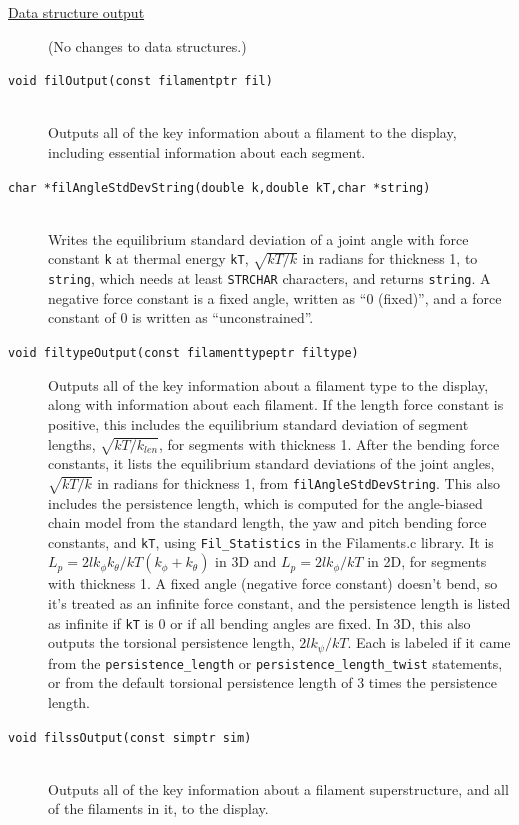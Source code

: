 \documentclass {scrbook}
\newcommand {\ttt} {\texttt}
\begin{document}
\begin{description}
\item[\underline{Data structure output}]
(No changes to data structures.)

\item[\ttt{void filOutput(const filamentptr fil)}]
\hfill \\
Outputs all of the key information about a filament to the display, including essential information about each segment.

\item[\ttt{char *filAngleStdDevString(double k,double kT,char *string)}]
\hfill \\
Writes the equilibrium standard deviation of a joint angle with force constant \ttt{k} at thermal energy \ttt{kT}, $\sqrt{kT/k}$ in radians for thickness 1, to \ttt{string}, which needs at least \ttt{STRCHAR} characters, and returns \ttt{string}. A negative force constant is a fixed angle, written as ``0 (fixed)'', and a force constant of 0 is written as ``unconstrained''.

\item[\ttt{void filtypeOutput(const filamenttypeptr filtype)}]
Outputs all of the key information about a filament type to the display, along with information about each filament. If the length force constant is positive, this includes the equilibrium standard deviation of segment lengths, $\sqrt{kT/k_{len}}$, for segments with thickness 1. After the bending force constants, it lists the equilibrium standard deviations of the joint angles, $\sqrt{kT/k}$ in radians for thickness 1, from \ttt{filAngleStdDevString}. This also includes the persistence length, which is computed for the angle-biased chain model from the standard length, the yaw and pitch bending force constants, and \ttt{kT}, using \ttt{Fil\_Statistics} in the Filaments.c library. It is $L_p = 2 l k_\phi k_\theta/kT(k_\phi+k_\theta)$ in 3D and $L_p = 2 l k_\phi/kT$ in 2D, for segments with thickness 1. A fixed angle (negative force constant) doesn't bend, so it's treated as an infinite force constant, and the persistence length is listed as infinite if \ttt{kT} is 0 or if all bending angles are fixed. In 3D, this also outputs the torsional persistence length, $2 l k_\psi/kT$. Each is labeled if it came from the \ttt{persistence\_length} or \ttt{persistence\_length\_twist} statements, or from the default torsional persistence length of 3 times the persistence length.

\item[\ttt{void filssOutput(const simptr sim)}]
\hfill \\
Outputs all of the key information about a filament superstructure, and all of the filaments in it, to the display.


\end{description}
\end{document}
